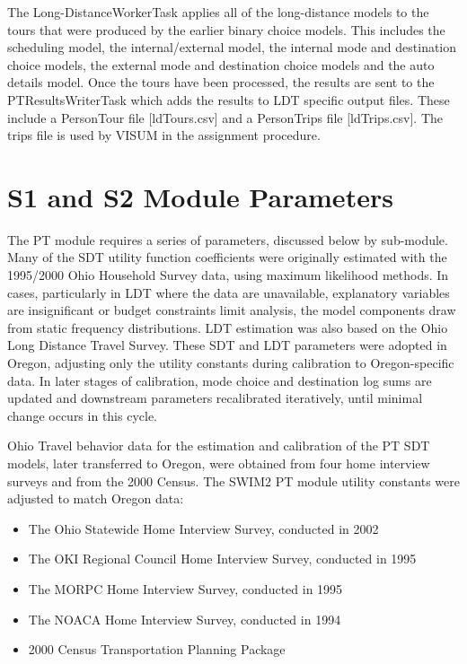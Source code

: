 The Long-DistanceWorkerTask applies all of the long-distance models to the tours that were produced by the earlier binary choice models. This includes the scheduling model, the internal/external model, the internal mode and destination choice models, the external mode and destination choice models and the auto details model. Once the tours have been processed, the results are sent to the PTResultsWriterTask which adds the results to LDT specific output files. These include a PersonTour file [ldTours.csv] and a PersonTrips file [ldTrips.csv]. The trips file is used by VISUM in the assignment procedure.

\section{S1 and S2 Module Parameters}\label{sec:pt-s1-s2}
The PT module requires a series of parameters, discussed below by sub-module. Many of the SDT utility function coefficients were originally estimated with the 1995/2000 Ohio Household Survey data, using maximum likelihood methods. In cases, particularly in LDT where the data are unavailable, explanatory variables are insignificant or budget constraints limit analysis, the model components draw from static frequency distributions. LDT estimation was also based on the Ohio Long Distance Travel Survey. These SDT and LDT parameters were adopted in Oregon, adjusting only the utility constants during calibration to Oregon-specific data. In later stages of calibration, mode choice and destination log sums are updated and downstream parameters recalibrated iteratively, until minimal change occurs in this cycle.

Ohio Travel behavior data for the estimation and calibration of the PT SDT models, later transferred to Oregon, were obtained from four home interview surveys and from the 2000 Census. The SWIM2 PT module utility constants were adjusted to match Oregon data:
\begin{itemize}
\item The Ohio Statewide Home Interview Survey, conducted in 2002
\item The OKI Regional Council Home Interview Survey, conducted in 1995
\item The MORPC Home Interview Survey, conducted in 1995
\item The NOACA Home Interview Survey, conducted in 1994
\item 2000 Census Transportation Planning Package
\end{itemize}

